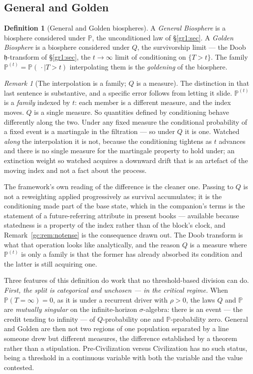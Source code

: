 \documentclass[11pt]{article}
\numberwithin{equation}{section}
\theoremstyle{plain}
\theoremstyle{definition}
\newtheorem{definition}[theorem]{Definition}
\theoremstyle{remark}
\newtheorem{remark}[theorem]{Remark}
\newcommand{\PP}{\mathbb{P}}
\newcommand{\hm}{\mathfrak{h}}
\begin{document}
\subsection{General and Golden}\label{gr:sub:generalgolden}

\begin{definition}[General and Golden biospheres]\label{gr:def:gg}
A \emph{General Biosphere} is a biosphere considered under $\PP$, the
unconditioned law of \S\ref{gr1:sec}. A \emph{Golden Biosphere} is a biosphere
considered under $Q$, the survivorship limit --- the Doob $\hm$-transform
of \S\ref{gr1:sec}, the $t\to\infty$ limit of conditioning on $\{T>t\}$. The
family $\PP^{(t)}=\PP(\,\cdot\mid T>t)$ interpolating them is the
\emph{goldening} of the biosphere.
\end{definition}

\begin{remark}[The interpolation is a family; $Q$ is a measure]
\label{gr:rem:familyvsmeasure}
The distinction in that last sentence is substantive, and a specific
error follows from letting it slide. $\PP^{(t)}$ is a \emph{family}
indexed by $t$: each member is a different measure, and the index moves.
$Q$ is a single measure. So quantities defined by conditioning behave
differently along the two. Under any fixed measure the conditional
probability of a fixed event is a martingale in the filtration --- so
under $Q$ it is one. Watched \emph{along} the interpolation it is not,
because the conditioning tightens as $t$ advances and there is no single
measure for the martingale property to hold under; an extinction weight
so watched acquires a downward drift that is an artefact of the moving
index and not a fact about the process.

The framework's own reading of the difference is the cleaner one. Passing
to $Q$ is not a reweighting applied progressively as survival
accumulates; it is the conditioning made part of the base state, which in
the companion's terms is the statement of a future-referring attribute in
present books \cite{Aethus} --- available because statedness is a
property of the index rather than of the block's clock, and
Remark~\ref{gc:rem:notense} is the consequence drawn out. The Doob transform is what that operation looks like
analytically, and the reason $Q$ is a measure where $\PP^{(t)}$ is only a
family is that the former has already absorbed its condition and the
latter is still acquiring one.
\end{remark}

Three features of this definition do work that no threshold-based
division can do. \emph{First, the split is categorical and unchosen --- in the critical
regime.} When $\PP(T=\infty)=0$, as it is under a recurrent driver with
$\rho>0$, the laws $Q$ and $\PP$ are \emph{mutually singular} on the
infinite-horizon $\sigma$-algebra: there is an event --- the credit
tending to infinity --- of $Q$-probability one and $\PP$-probability
zero. General and Golden are then not two regions of one population
separated by a line someone drew but different measures, the difference
established by a theorem rather than a stipulation. Pre-Civilization
versus Civilization has no such status, being a threshold in a
continuous variable with both the variable and the value contested.
\end{document}
